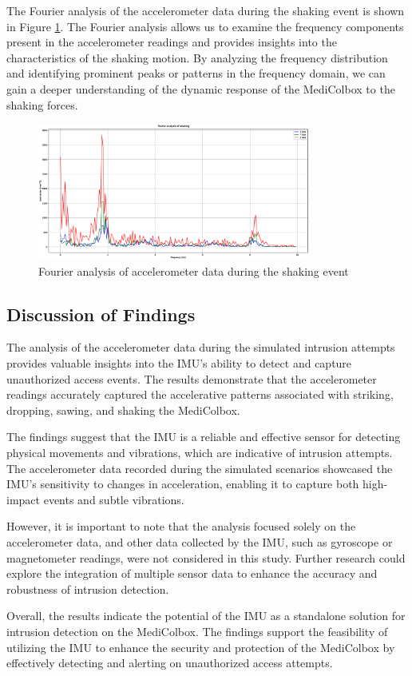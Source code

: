 \documentclass[../main.tex]{subfiles}
\begin{document}
The Fourier analysis of the accelerometer data during the
shaking event is shown in
Figure \ref{fig:fourier_accelerometer_shaking}.
The Fourier analysis allows us to examine the
frequency components present in the accelerometer readings and
provides insights into the characteristics of the shaking motion.
By analyzing the frequency distribution and
identifying prominent peaks or patterns in the frequency domain,
we can gain a deeper understanding of the
dynamic response of the MediColbox to the shaking forces.


\begin{figure}[htbp]
    \centering
    \includegraphics[width=0.8\textwidth]{resources/figures/Fourier_acceleration_shaking.eps}
    \caption{Fourier analysis of accelerometer data during the shaking event}
    \label{fig:fourier_accelerometer_shaking}
\end{figure}

\subsection{Discussion of Findings}

The analysis of the accelerometer data during the
simulated intrusion attempts provides valuable insights into the
IMU's ability to detect and capture unauthorized access events.
The results demonstrate that the
accelerometer readings accurately captured the
accelerative patterns associated with striking,
dropping, sawing, and shaking the MediColbox.

The findings suggest that the IMU is a reliable and
effective sensor for detecting physical movements and vibrations,
which are indicative of intrusion attempts.
The accelerometer data recorded during the
simulated scenarios showcased the IMU's sensitivity to
changes in acceleration,
enabling it to capture both high-impact events and
subtle vibrations.

However, it is important to note that the analysis
focused solely on the accelerometer data,
and other data collected by the IMU,
such as gyroscope or magnetometer readings,
were not considered in this study.
Further research could explore the
integration of multiple sensor data to enhance the
accuracy and robustness of intrusion detection.

Overall, the results indicate the potential of the IMU as
a standalone solution for intrusion detection on the
MediColbox. The findings support the feasibility of
utilizing the IMU to enhance the security and protection of the
MediColbox by effectively detecting and alerting on
unauthorized access attempts.
\end{document}

